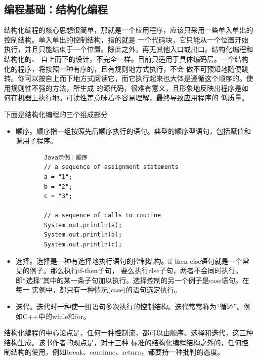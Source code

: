 \documentclass{article}
\begin{document}
\subsection{编程基础：结构化编程}
结构化编程的核心思想很简单，那就是一个应用程序，应该只采用一些单入单出的控制结构。单入单出的控制结构，指的就是
一个代码块，它只能从一个位置开始执行，并且只能结束于一个位置。除此之外，再无其他入口或出口。结构化编程和结构化的、
自上而下的设计，不完全一样。目前只适用于具体编码层。一个结构化的程序，将按照一种有序的，且有规则地方式执行，不会
做不可预知地随便跳转。你可以按自上而下地方式阅读它，而它执行起来也大体是遵循这个顺序的。使用规则性不强的方法，所生成
的源代码，很难有意义，且形象地反映出程序是如何在机器上执行地。可读性差意味着不容易理解，最终导致应用程序的
低质量。

\par
下面是结构化编程的三个组成部分
\par
\begin{itemize}
    \item 顺序。顺序指一组按照先后顺序执行的语句。典型的顺序型语句，包括赋值和调用子程序。
    \begin{lstlisting}
        Java示例：顺序
        // a sequence of assignment statements
        a = "1";
        b = "2";
        c = "3";

        // a sequence of calls to routine
        System.out.println(a);
        System.out.println(b);
        System.out.println(c);
    \end{lstlisting}
    \item 选择。选择是一种有选择地执行语句的控制结构。if-then-else语句就是一个常见的例子。那么执行if-then子句，
    要么执行else子句，两者不会同时执行。即“选择”其中的某一条子句加以执行。选择控制的另一个例子是case语句。在每一
    实例中，都只有一种情况(case)的语句选定执行。
    \item 迭代。迭代时一种使一组语句多次执行的控制结构。迭代常常称为“循环”。例如C++中的while和for。
\end{itemize}
结构化编程的中心论点是，任何一种控制流，都可以由顺序、选择和迭代，这三种结构生成。该书作者的观点是，对于三种
标准的结构化编程结构之外的，任何控制结构的使用，例如break、continue、return，都要持一种批判的态度。
\end{document}
